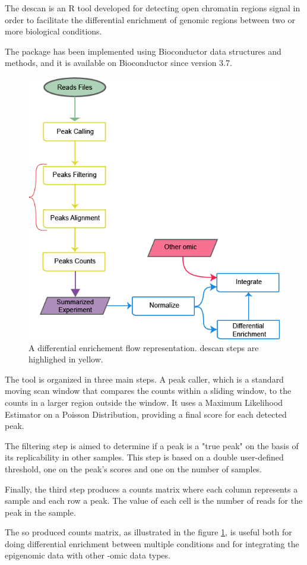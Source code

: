 The \gls{descan} is an R \cite{Ihaka1996} tool developed for detecting open chromatin regions signal in order to facilitate the differential enrichment of genomic regions between two or more biological conditions.

The package has been implemented using Bioconductor \cite{Gentleman2004} data structures and methods, and it is available on Bioconductor since version 3.7.

\begin{figure}[H]
\centering
\includegraphics[width=\textwidth,height=\textheight,keepaspectratio]{img/descan2/flow.png}
\caption[DEScan2 workflow]{A differential enrichement flow representation. \gls{descan} steps are highlighed in yellow.}
\label{fig:descan2flow}
\end{figure}

The tool is organized in three main steps. 
A peak caller, which is a standard moving scan window that compares the counts within a sliding window, to the counts in a larger region outside the window. It uses a Maximum Likelihood Estimator on a Poisson Distribution, providing a final score for each detected peak.


The filtering step is aimed to determine if a peak is a "true peak" on the basis of its replicability in other samples. This step is based on a double user-defined threshold, one on the peak's scores and one on the number of samples.


Finally, the third step produces a counts matrix where each column represents a sample and each row a peak. The value of each cell is the number of reads for the peak in the sample.

The so produced counts matrix, as illustrated in the figure \ref{fig:descan2flow}, is useful both for doing differential enrichment between multiple conditions and for integrating the epigenomic data with other -omic data types.




